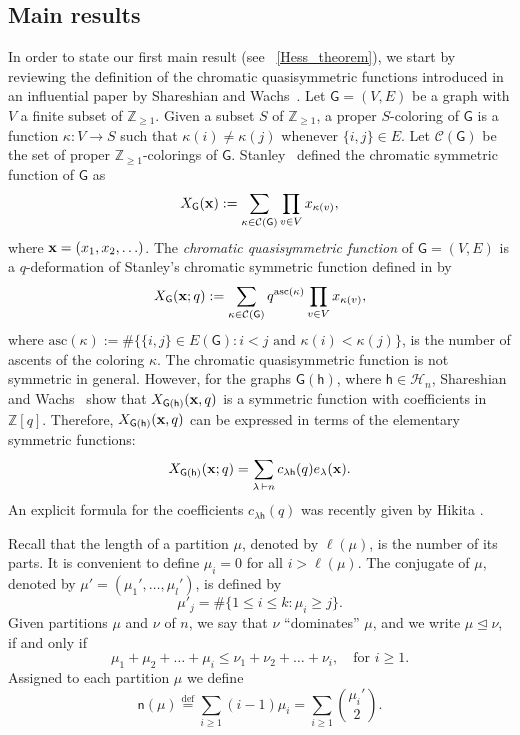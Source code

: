\documentclass[12pt,a4paper,reqno]{amsart}
\theoremstyle{plain}
\theoremstyle{definition}
\newcommand{\defin}{\overset{\mathrm{def}}{=}}
\newcommand{\less}{\unlhd}
\newcommand{\1}{\mathds{1}}
\newcommand{\x}{{\bf x}}
\newcommand{\fn}{\mathsf{n}}
\newcommand{\hes}{\mathsf{h}}
\newcommand{\graph}{\mathsf{G}}
\begin{document}
\subsection{Main results}
\label{subsec:mainthm}
In order to state our first main result (see ~\cref{Hess_theorem}), we start by reviewing the definition of  the chromatic quasisymmetric functions introduced in an influential paper by Shareshian and Wachs~\cite{Shareshian-Wachs}.
Let $\graph = (V, E)$ be a graph with $V$ a finite subset of $\mathbb{Z}_{\geq 1}$. Given a subset $S$ of $\mathbb{Z}_{\geq 1}$, a proper $S$-coloring of $\graph$ is a function $\kappa \colon V \to S$ such that $\kappa(i) \neq \kappa(j)$ whenever $\{i,j\} \in E$. Let $\mathcal{C}(\graph)$ be the set of proper $\mathbb{Z}_{\geq 1}$-colorings of $\graph$. Stanley~\cite{Stanley_symmetric} defined the chromatic symmetric function of $\graph$ as
\[
X_\graph(\x) := \sum_{\kappa \in \mathcal{C}(\graph)} \prod_{v \in V} x_{\kappa(v)},
\]
where $\x=(x_1,x_2,\ldots)$. The \emph{chromatic quasisymmetric function} of $\graph = (V, E)$ is a $q$-deformation of Stanley's chromatic symmetric function defined in \cite{Shareshian-Wachs} by
\begin{align*}
  X_\graph(\x;q):=\sum_{\kappa \in \mathcal{C}(\graph)} q^{\mathrm{asc}({\kappa})}\prod_{v \in V} x_{\kappa(v)},
\end{align*}
where $\mathrm{asc}(\kappa):=\#\{\{i,j\}\in E(\graph):i<j \text{ and }\kappa(i)<\kappa(j)\}$,
is the number of ascents of the coloring $\kappa$. The chromatic quasisymmetric function is not symmetric in general. However, for the graphs $\graph(\hes)$, where $\hes\in\mathcal{H}_n$, Shareshian and Wachs~\cite[Theorem 4.5]{Shareshian-Wachs} show that $X_{\graph(\hes)}(\x,q)$ is a  symmetric function with coefficients in $\mathbb{Z}[q]$. Therefore, $X_{\graph(\hes)}(\x,q)$ can be expressed in terms of the elementary symmetric functions:
$$
X_{\graph(\hes)}(\x;q)=\sum_{\lambda\,\vdash n}c_{\lambda\hes}(q)e_\lambda(\x). 
$$
An explicit formula for the coefficients $c_{\lambda\hes}(q)$ was recently given by Hikita \cite[Theorem 1.7]{hikita2024}. 





Recall that the length of a partition 
$\mu$, denoted 
by $\ell(\mu)$, is the number of its parts.
 It is convenient to define $\mu_i = 0$ for all $i >\ell(\mu)$.  The conjugate of $\mu$, denoted by $\mu'=(\mu_1',\dots, \mu_l')$,  is defined by 
$$\mu'_j=\#\{1\leq i\leq k: \mu_i\geq j\}.$$
 Given partitions $\mu$ and $\nu$ of $n$, we say that $\nu$ ``dominates'' $\mu$, and we write $\mu \less \nu$, if and only if
$$
\mu_1+\mu_2+\dots+\mu_i\leq\nu_1+\nu_2+\dots+\nu_i, \quad\text{for } i\geq 1.$$
  Assigned to each partition $\mu$ we define 
\begin{equation}\label{n_mu:dif}
\fn(\mu)\defin \sum_{i\geq 1}(i-1)\mu_i=\sum_{i\geq 1}\binom{\mu_i'}{2}. 
\end{equation}
\end{document}
